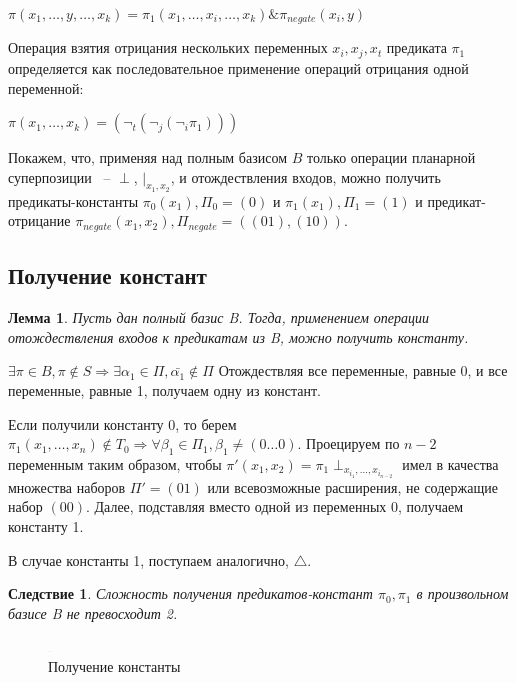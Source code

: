 \documentclass[12pt]{article}
\newtheorem{lemma}[theorem]{Лемма}
\newtheorem{corollary}[theorem]{Следствие}
\newenvironment{proof}[1][Доказательство]{\begin{trivlist}
\item[\hskip \labelsep {\bfseries #1}]}{\end{trivlist}}
\begin{document}
$\pi(x_1, \dots, y, \dots, x_k) = \pi_1(x_1, \dots, x_i, \dots, x_k) \& \pi_{negate}(x_i, y)$

Операция взятия отрицания нескольких переменных $x_i, x_j, x_t$ предиката $\pi_1$
определяется как последовательное применение операций отрицания одной переменной:

$\pi(x_1, \dots, x_k) = (\neg_t (\neg_j (\neg_i \pi_1)))$

Покажем, что, применяя над полным базисом $B$ только операции планарной суперпозиции ~-- $\perp$, $|_{x_1, x_2}$,
и отождествления входов, можно получить предикаты-константы
$\pi_0(x_1), \Pi_0=(0)$ и $\pi_1(x_1), \Pi_1=(1)$ и предикат-отрицание $\pi_{negate}(x_1, x_2), \Pi_{negate}=( (01), (10) )$.

\subsection{Получение констант}
\begin{lemma}
\label{eq:const}
Пусть дан полный базис B. Тогда, применением операции отождествления входов к предикатам из B,
можно получить константу.
\end{lemma}

\begin{proof}
$\exists \pi \in B, \pi \notin S \Rightarrow \exists \alpha_1 \in \Pi, \bar{\alpha_1} \notin \Pi$
Отождествляя все переменные, равные 0, и все переменные, равные 1, получаем одну из констант.

Если получили константу 0, то берем 
$\pi_1(x_1, \dots, x_n) \notin T_0 \Rightarrow \forall \beta_1 \in \Pi_1, \beta_1 \neq (0 \ldots 0)$. 
Проецируем по $n-2$ переменным таким образом, чтобы $\pi'(x_1, x_2) = \pi_1 \perp_{x_{i_1}, \dots, x_{i_{n-2}}}$
имел в качества множества наборов $\Pi' = { (01) }$ или всевозможные расширения, не содержащие набор $(00)$.
Далее, подставляя вместо одной из переменных 0, получаем константу 1. 

В случае константы 1, поступаем аналогично, $\bigtriangleup$.
\end{proof}
\begin{corollary}
\label{corol:const}
Сложность получения предикатов-констант $\pi_0, \pi_1$ в произвольном базисе B не превосходит 2.
\end{corollary}
\begin{figure}[htb]
\centering
\includegraphics[width=0.01\textwidth]{3_2to3.png}
\caption{Получение константы}
\label{fig:constant}
\end{figure}
\end{document}
